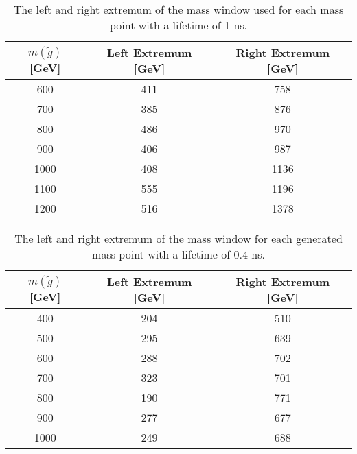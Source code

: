 \begin{table}[!htbp]
  \begin{center}
    \begin{tabular}{ccc}
        \hline
        $m(\tilde{g})$ [GeV]  & Left Extremum [GeV] & Right Extremum [GeV] \\
        \hline
        600    & 411 & 758 \\
        700    & 385 & 876 \\
        800    & 486 & 970 \\
        900    & 406 & 987 \\
        1000    & 408 & 1136 \\
        1100    & 555 & 1196 \\
        1200    & 516 & 1378 \\
        \hline
    \end{tabular}
  \end{center}
  \caption{The left and right extremum of the mass window used for each mass point with a lifetime of 1 ns.}
  \label{tab:app_window_1ns}
\end{table}

\begin{table}[!htbp]
  \begin{center}
    \begin{tabular}{ccc}
        \hline
        $m(\tilde{g})$ [GeV]  & Left Extremum [GeV] & Right Extremum [GeV] \\
        \hline
        400    & 204 & 510 \\
        500    & 295 & 639 \\
        600    & 288 & 702 \\
        700    & 323 & 701 \\
        800    & 190 & 771 \\
        900    & 277 & 677 \\
        1000    & 249 & 688 \\
        \hline
    \end{tabular}
  \end{center}
  \caption{The left and right extremum of the mass window for each generated mass point with a lifetime of 0.4 ns.}
  \label{tab:app_window_p4ns}
\end{table}

